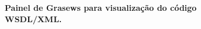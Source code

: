 \begin{figure}[h]
    \centering
    \caption[Painel de Grasews para visualização do código WSDL/XML]{\textbf{Painel de Grasews para visualização do código WSDL/XML.}}
    \label{fig:grasews-painel-codigo}
\end{figure}